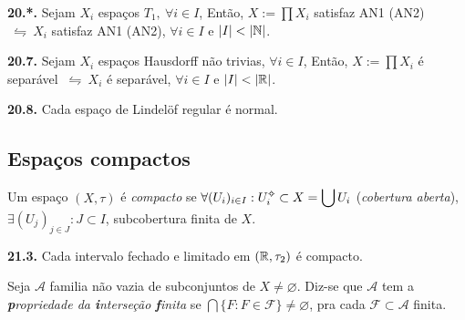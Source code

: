 \begin{proposition}
    \textbf{20.*.} Sejam \(X_i\) espaços \( T_1, \ \forall i \in I\), Então, \(X:= \prod X_i\) satisfaz AN1 (AN2) \(\ \leftrightharpoons \ X_i\) satisfaz AN1 (AN2), \(\forall i \in I\) e \(|I| < |\mathbb{N}|\). 
\end{proposition}

\begin{proposition}
    \textbf{20.7.} Sejam \(X_i\) espaços Hausdorff não trivias, \(\forall i \in I\), Então, \(X:= \prod X_i\) é separável \(\ \leftrightharpoons \ X_i\) é separável, \(\forall i \in I\) e \(|I| < |\mathbb{R}|\). 
\end{proposition}

\begin{theorem}
    \textbf{20.8.} Cada espaço de Lindelöf regular é normal. 
\end{theorem}

\subsection*{Espaços compactos}

\begin{definition}
    Um espaço \((X,\tau)\) é \emph{compacto} se \(\forall (U_i)_{i\in I}: U_i\ab \subset  X = \displaystyle\bigcup U_i\) (\emph{cobertura aberta}), \(\exists (U_j)_{j\in J} : J \subset I\), subcobertura finita de \(X\).   
\end{definition}

\hypertarget{prop213}{}
\begin{proposition}
    \textbf{21.3.} Cada intervalo fechado e limitado em \((\mathbb{R}, \tau_2)\) é compacto. 
\end{proposition}

\begin{definition}
    Seja \(\mathcal{A}\) familia não vazia de subconjuntos de \(X \neq \varnothing\). Diz-se que \(\mathcal{A}\) tem a \emph{\textbf{p}ropriedade da \textbf{i}nterseção \textbf{f}inita} se \(\bigcap \{F: F  \in \mathcal{F}\} \neq \varnothing\), pra cada \(\mathcal{F}\subset \mathcal{A}\) finita. 
\end{definition}

